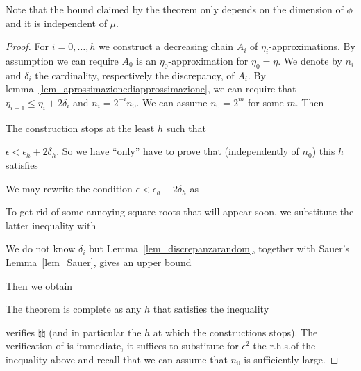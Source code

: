 \documentclass[combinatorics.tex]{subfiles}
\begin{document}
Note that the bound claimed by the theorem only depends on the dimension of $\phi$ and it is independent of $\mu$.

\begin{proof}
For $i=0,\dots,h$ we construct a decreasing chain $A_i$ of $\eta_i$-approximations.
By assumption we can require $A_0$ is an $\eta_0$-approximation for $\eta_0=\eta$.
We denote by $n_i$ and $\delta_i$ the cardinality, respectively the discrepancy, of $A_i$.
By lemma~\ref{lem_aprossimazionediapprossimazione}, we can require that $\eta_{i+1}\le\eta_i+2\delta_i$ and $n_i=2^{-i}n_0$. We can assume $n_0=2^m$ for some $m$.
Then


The construction stops at the least $h$ such that 






$\epsilon<\epsilon_h+2\delta_h$.
So we have ``only'' have to prove that (independently of $n_0$) this $h$ satisfies


We may rewrite the condition $\epsilon<\epsilon_h+2\delta_h$ as


To get rid of some annoying square roots that will appear soon, we substitute the latter inequality with


% 

We do not know $\delta_i$ but Lemma~\ref{lem_discrepanzarandom}, together with Sauer's Lemma~\ref{lem_Sauer}, gives an upper bound




Then we obtain


The theorem is complete as any $h$ that satisfies the inequality


verifies $\natural\natural$ (and in particular the $h$ at which the constructions stops).
The verification of is immediate, it suffices to substitute for $\epsilon^2$ the r.h.s.\@ of the inequality above and recall that we can assume that $n_0$ is sufficiently large.
\end{proof}
\end{document}
